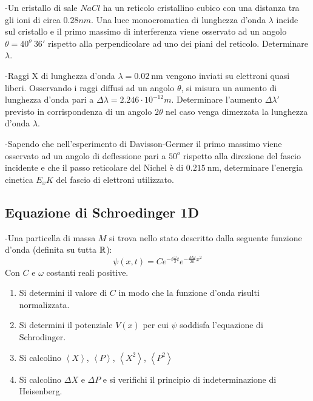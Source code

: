 \documentclass[12pt,twoside,a4]{article}
\begin{document}
\begin{esercizio}
	-Un cristallo di sale $NaCl$ ha un reticolo cristallino cubico con una distanza tra gli ioni di circa $0.28 nm$. Una luce monocromatica di lunghezza d'onda $\lambda$ incide sul cristallo e il primo massimo di interferenza viene osservato ad un angolo $\theta = 40^o \ 36'$ rispetto alla perpendicolare ad uno dei piani del reticolo. Determinare $\lambda$.
\end{esercizio}

\begin{esercizio}
	-Raggi X di lunghezza d'onda $\lambda=0.02 \ \mathrm{nm}$ vengono inviati su elettroni quasi liberi. Osservando i raggi diffusi ad un angolo $\theta$, si misura un aumento di lunghezza d'onda pari a $\Delta \lambda = 2.246 \cdot 10^{-12}m$. Determinare l'aumento $\Delta \lambda'$ previsto in corrispondenza di un angolo $2 \theta$ nel caso venga dimezzata la lunghezza d'onda $\lambda$.
\end{esercizio}

\newpage
\begin{esercizio}
	-Sapendo che nell'esperimento di Davisson-Germer il primo massimo viene osservato ad un angolo di deflessione pari a $50^o$ rispetto alla direzione del fascio incidente e che il passo reticolare del Nichel è di $0.215 \ \mathrm{nm}$, determinare l'energia cinetica $E_xK$ del fascio di elettroni utilizzato.
\end{esercizio}



\newpage
\subsection{Equazione di Schroedinger 1D}
\begin{esercizio}
	-Una particella di massa $M$ si trova nello stato descritto dalla seguente funzione d'onda (definita su tutta $\mathbb{R}$):
\begin{equation*}
	\psi(x,t)=Ce^{-i \frac{\omega}{2}t}e^{- \frac{M\omega}{2 \hbar}x^2}
\end{equation*}
Con $C$ e $\omega$ costanti reali positive.
\begin{enumerate}[label=(\textit{\roman*})]
	\item Si determini il valore di $C$ in modo che la funzione d'onda risulti normalizzata.
	\item Si determini il potenziale $V(x)$ per cui $\psi$ soddisfa l'equazione di Schrodinger.
	\item Si calcolino $\left< X\right>$, $\left< P\right>$, $\left< X^2\right>$, $\left< P^2\right>$
	\item Si calcolino $\Delta X$ e $\Delta P$ e si verifichi il principio di indeterminazione di Heisenberg.
\end{enumerate}
\end{esercizio}
\end{document}
